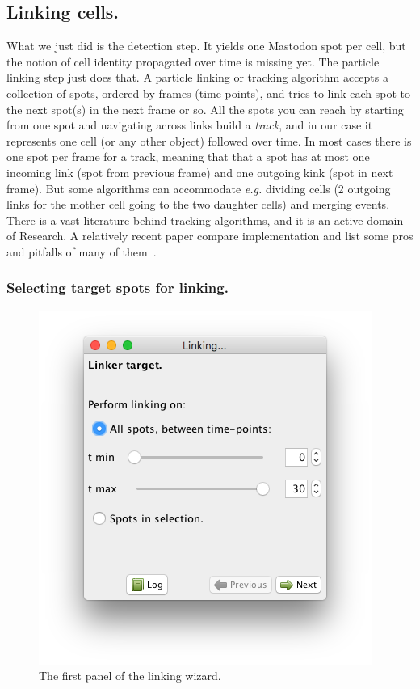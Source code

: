 \subsection{Linking cells.}

What we just did is the detection step. 
It yields one Mastodon spot per cell, but the notion of cell identity propagated over time is missing yet.
The particle linking step just does that.
A particle linking or tracking algorithm accepts a collection of spots, ordered by frames (time-points), and tries to link each spot to the next spot(s) in the next frame or so. 
All the spots you can reach by starting from one spot and navigating across links build a \textit{track}, and in our case it represents one cell (or any other object) followed over time. 
In most cases there is one spot per frame for a track, meaning that that a spot has at most one incoming link (spot from previous frame) and one outgoing kink (spot in next frame). 
But some algorithms can accommodate \textit{e.g.} dividing cells (2 outgoing links for the mother cell going to the two daughter cells) and merging events. There is a vast literature behind tracking algorithms, and it is an active domain of Research. A relatively recent paper compare implementation and list some pros and pitfalls of many of them~\cite{Chenouard2014}.

\subsubsection{Selecting target spots for linking.}

\begin{figure}
    \centering
    \includegraphics[height=0.3\textwidth,trim=0.5cm .5cm .5cm .5cm,clip]{figures/Mastodon_LinkingWizard_01.png}
    \caption{The first panel of the linking wizard.}
    \label{fig:LinkingWizardFirstPanel}
\end{figure}

